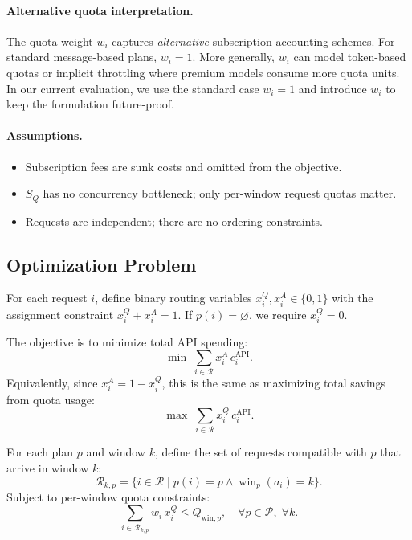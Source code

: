 \documentclass[11pt]{article}
\begin{document}
\paragraph{Alternative quota interpretation.}
The quota weight \(w_i\) captures \emph{alternative} subscription accounting schemes. For standard message-based plans, \(w_i=1\).
More generally, \(w_i\) can model token-based quotas or implicit throttling where premium models consume more quota units.
In our current evaluation, we use the standard case \(w_i=1\) and introduce \(w_i\) to keep the formulation future-proof.

\paragraph{Assumptions.}
\begin{itemize}
  \item Subscription fees are sunk costs and omitted from the objective.
  \item \(S_Q\) has no concurrency bottleneck; only per-window request quotas matter.
  \item Requests are independent; there are no ordering constraints.
\end{itemize}

\subsection{Optimization Problem}
For each request \(i\), define binary routing variables \(x_i^Q, x_i^A \in \{0,1\}\) with the assignment constraint \(x_i^Q + x_i^A = 1\).
If \(p(i)=\varnothing\), we require \(x_i^Q = 0\).

The objective is to minimize total API spending:
\[
  \min\; \sum_{i\in\mathcal{R}} x_i^A\,c_i^{\text{API}}.
\]
Equivalently, since \(x_i^A = 1 - x_i^Q\), this is the same as maximizing total savings from quota usage:
\[
  \max\; \sum_{i\in\mathcal{R}} x_i^Q\,c_i^{\text{API}}.
\]

For each plan \(p\) and window \(k\), define the set of requests compatible with \(p\) that arrive in window \(k\):
\[
  \mathcal{R}_{k,p} = \{ i \in \mathcal{R} \mid p(i)=p \land \operatorname{win}_p(a_i)=k \}.
\]
Subject to per-window quota constraints:
\[
  \sum_{i\in\mathcal{R}_{k,p}} w_i\,x_i^Q \le Q_{\text{win},p}, \quad \forall p \in \mathcal{P},\; \forall k.
\]
\end{document}

